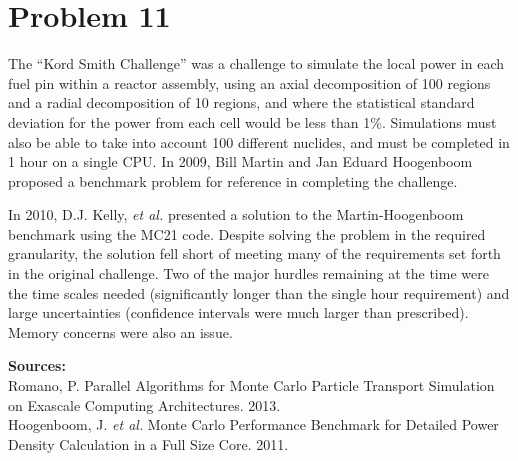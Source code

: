 \documentclass{article}
\begin{document}
 

\section*{Problem 11}

The ``Kord Smith Challenge'' was a challenge to simulate the local power in each fuel pin within a reactor assembly, using an axial decomposition of 100 regions and a radial decomposition of 10 regions, and where the statistical standard deviation for the power from each cell would be less than 1\%. Simulations must also be able to take into account 100 different nuclides, and must be completed in 1 hour on a single CPU. In 2009, Bill Martin and Jan Eduard Hoogenboom proposed a benchmark problem for reference in completing the challenge. 

In 2010, D.J. Kelly, \textit{et al.} presented a solution to the Martin-Hoogenboom benchmark using the MC21 code. Despite solving the problem in the required granularity, the solution fell short of meeting many of the requirements set forth in the original challenge. Two of the major hurdles remaining at the time were the time scales needed (significantly longer than the single hour requirement) and large uncertainties (confidence intervals were much larger than prescribed). Memory concerns were also an issue.

\textbf{Sources:}\\
Romano, P. Parallel Algorithms for Monte Carlo Particle Transport Simulation on
Exascale Computing Architectures. 2013. \\
Hoogenboom, J. \textit{et al.} Monte Carlo Performance Benchmark for Detailed Power Density Calculation in a Full Size Core. 2011. \\



\end{document}
